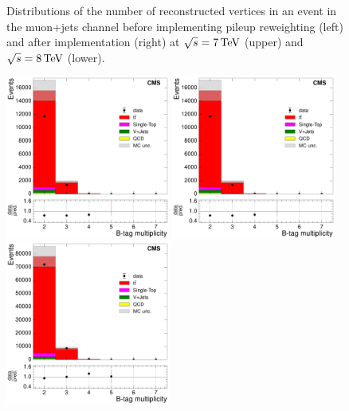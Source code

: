 \begin{figure}[hbtp]
     \caption{Distributions of the number of reconstructed vertices in an event in the muon+jets
     channel before implementing pileup reweighting (left) and after implementation (right) at $\sqrt{s}=7\,\text{Te\hspace{-.08em}V}$
     (upper) and $\sqrt{s}=8\,\text{Te\hspace{-.08em}V}$ (lower).}
     \label{fig:nvertices_before_and_after_pileup_reweighting_muons}
\end{figure}

\begin{figure}[hbtp]
    \centering
      \includegraphics[width=0.48\textwidth]{Chapters/04_Analysis/04b_XSections/images/control_plots/before_fit/7TeV/MuPlusJets_N_BJets_with_ratio}\hfill
      \includegraphics[width=0.48\textwidth]{Chapters/04_Analysis/04b_XSections/images/control_plots/before_fit/7TeV/MuPlusJets_N_BJets_reweighted_with_ratio}\\
      \includegraphics[width=0.48\textwidth]{Chapters/04_Analysis/04b_XSections/images/control_plots/before_fit/8TeV/MuPlusJets_N_BJets_with_ratio}\hfill

\end{figure}
